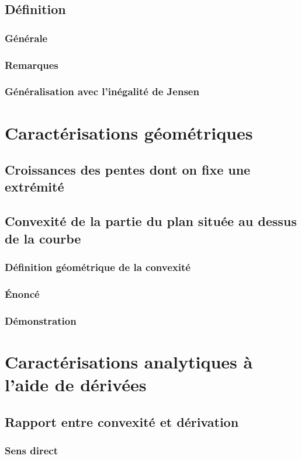 \documentclass[12pt,a4paper,french]{book}
\begin{document}
		\subsection{Définition}
			\subsubsection{Générale}
			\subsubsection{Remarques}
			\subsubsection{Généralisation avec l'inégalité de Jensen}
	\section{Caractérisations géométriques}
		\subsection{Croissances des pentes dont on fixe une extrémité}
		\subsection{Convexité de la partie du plan située au dessus de la courbe}
			\subsubsection{Définition géométrique de la convexité}
			\subsubsection{Énoncé}
			\subsubsection{Démonstration}
	\section{Caractérisations analytiques à l'aide de dérivées}
		\subsection{Rapport entre convexité et dérivation}
			\subsubsection{Sens direct}
\end{document}
